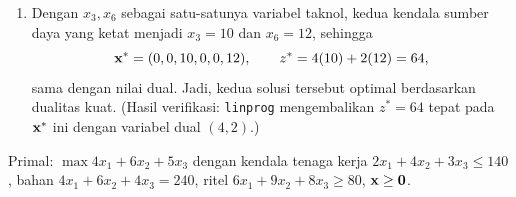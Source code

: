 \begin{enumerate}
\[
\begin{aligned}
x_1&: & 4 + 2(2) &= 8 > 3 &&\Rightarrow x_1 = 0, &
x_2&: & 2(4) &= 8 > 2 &&\Rightarrow x_2 = 0, \\
x_4&: & 2 &> 1 &&\Rightarrow x_4 = 0, &
x_5&: & 4 + 3(2) &= 10 > 5 &&\Rightarrow x_5 = 0,
\end{aligned}
\]
sedangkan kendala untuk $x_3$ ($y_1 \ge 4$, ketat) dan $x_6$ ($y_2 \ge 2$, ketat) memungkinkan $x_3, x_6 > 0$. Variabel basisnya adalah $x_3$ dan $x_6$.
\item Dengan $x_3, x_6$ sebagai satu-satunya variabel taknol, kedua kendala sumber daya yang ketat menjadi $x_3 = 10$ dan $x_6 = 12$, sehingga
\[
\mathbf{x}^* = (0, 0, 10, 0, 0, 12), \qquad z^* = 4(10) + 2(12) = 64,
\]
sama dengan nilai dual. Jadi, kedua solusi tersebut optimal berdasarkan dualitas kuat. (Hasil verifikasi: \texttt{linprog} mengembalikan $z^* = 64$ tepat pada $\mathbf{x}^*$ ini dengan variabel dual $(4, 2)$.)
\end{enumerate}


Primal: $\max 4x_1 + 6x_2 + 5x_3$ dengan kendala tenaga kerja $2x_1 + 4x_2 + 3x_3 \le 140$, bahan $4x_1 + 6x_2 + 4x_3 = 240$, ritel $6x_1 + 9x_2 + 8x_3 \ge 80$, $\mathbf{x} \ge \mathbf{0}$.

